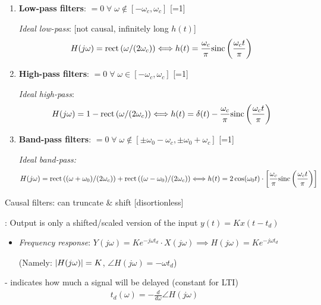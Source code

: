 \documentclass[12pt]{extarticle}
\begin{document}
\newp
{} \begin{enumerate}
    \item \textbf{Low-pass filters}: $=0\;\forall\;\omega\not\in[-\omega_c,\omega_c]$ [=1]

    \textit{Ideal low-pass}: [not causal, infinitely long $h(t)$] \begin{align*}
        H(j\omega)=\text{rect}\left(\omega/(2\omega_c)\right)\Longleftrightarrow h(t)=\frac{\omega_c}{\pi}\text{sinc}\left(\frac{\omega_ct}{\pi}\right)
    \end{align*}
    \item \textbf{High-pass filters}: $=0\;\forall\;\omega\in[-\omega_c,\omega_c]$ [=1]

    \textit{Ideal high-pass}: \begin{align*}
        H(j\omega)=1-\text{rect}\left(\omega/(2\omega_c)\right)\Longleftrightarrow h(t)=\delta(t)-\frac{\omega_c}{\pi}\text{sinc}\left(\frac{\omega_ct}{\pi}\right)
    \end{align*}
    \item \textbf{Band-pass filters}: $=0\;\forall\;\omega\not\in[\pm\omega_0-\omega_c,\pm\omega_0+\omega_c]$ [=1]

    \textit{Ideal band-pass:} \begin{align*}
        H(j\omega)=\text{rect}\left((\omega+\omega_0)/(2\omega_c)\right)+\text{rect}\left((\omega-\omega_0)/(2\omega_c)\right)\Longleftrightarrow h(t)=2\cos(\omega_0t)\cdot\left[\frac{\omega_c}{\pi}\text{sinc}\left(\frac{\omega_ct}{\pi}\right)\right]
    \end{align*}
\end{enumerate}
\newp
Causal filters: can truncate \& shift [disortionless]

\newp
{}: Output is only a shifted/scaled version of the input $y(t)=Kx(t-t_d)$ \begin{itemize}
    \item \textit{Frequency response}: $Y(j\omega)=Ke^{-j\omega t_d}\cdot X(j\omega)\implies H(j\omega)=Ke^{-j\omega t_d}$ 
    
    (Namely: $\left|H(j\omega)\right|=K$, $\angle H(j\omega)=-\omega t_d$)
\end{itemize}

\newp
{} - indicates how much a signal will be delayed (constant for LTI) \begin{align*}
    t_d(\omega)=-\frac{d}{d\omega}\angle H(j\omega)
\end{align*}

\pagebreak
\end{document}
